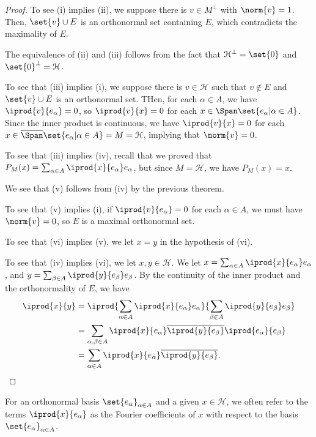 \documentclass[10pt]{mypackage}
\begin{document}
\begin{proof}
  To see (i) implies (ii), we suppose there is $v\in M^{\perp}$ with $\norm{v} = 1$. Then, $\set{v}\cup E$ is an orthonormal set containing $E$, which contradicts the maximality of $E$.\newline

  The equivalence of (ii) and (iii) follows from the fact that $\mathcal{H}^{\perp} = \set{0}$ and $\set{0}^{\perp} = \mathcal{H}$.\newline

  To see that (iii) implies (i), we suppose there is $v\in \mathcal{H}$ such that $v\notin E$ and $\set{v}\cup E$ is an orthonormal set. THen, for each $\alpha \in A$, we have $ \iprod{v}{e_{\alpha}} = 0 $, so $ \iprod{v}{x} = 0 $ for each $x\in \Span\set{e_{\alpha} | \alpha \in A}$. Since the inner product is continuous, we have $ \iprod{v}{x} = 0 $ for each $x\in \overline{\Span}\set{e_{\alpha} | \alpha \in A} = M = \mathcal{H}$, implying that $\norm{v} =0$.\newline

  To see that (iii) implies (iv), recall that we proved that $P_M(x) = \sum_{\alpha \in A} \iprod{x}{e_{\alpha}}e_{\alpha}$, but since $M = \mathcal{H}$, we have $P_M(x) = x$.\newline

  We see that (v) follows from (iv) by the previous theorem.\newline

  To see that (v) implies (i), if $ \iprod{v}{e_{\alpha}} = 0 $ for each $\alpha \in A$, we must have $\norm{v} = 0$, so $E $ is a maximal orthonormal set.\newline

  To see that (vi) implies (v), we let $x = y$ in the hypothesis of (vi).\newline

  To see that (iv) implies (vi), we let $x,y\in \mathcal{H}$. We let $x = \sum_{\alpha \in A} \iprod{x}{e_{\alpha}}e_{\alpha}$, and $y = \sum_{\beta\in A} \iprod{y}{e_{\beta}} e_{\beta}$. By the continuity of the inner product and the orthonormality of $E$, we have
  \begin{align*}
    \iprod{x}{y} &= \iprod{\sum_{\alpha \in A} \iprod{x}{e_{\alpha}}e_{\alpha}}{ \sum_{\beta\in A} \iprod{y}{e_{\beta}}e_{\beta} }\\
                 &= \sum_{\alpha,\beta \in A} \iprod{x}{e_{\alpha}} \overline{\iprod{y}{e_{\beta}}} \iprod{e_{\alpha}}{e_{\beta}}\\
                 &= \sum_{\alpha \in A} \iprod{x}{e_{\alpha}} \overline{ \iprod{y}{e_{\beta}} }.
  \end{align*}
  
\end{proof}
For an orthonormal basis $\set{e_{\alpha}}_{\alpha \in A}$ and a given $x\in \mathcal{H}$, we often refer to the terms $ \iprod{x}{e_{\alpha}} $ as the Fourier coefficients of $x$ with respect to the basis $\set{e_{\alpha}}_{\alpha \in A}$.\newline
\end{document}
